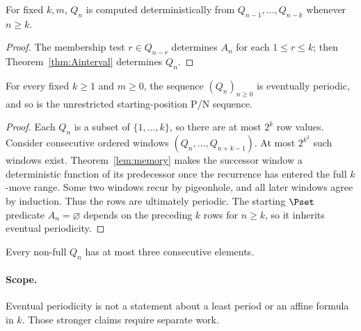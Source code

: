 \begin{lemma}\label{lem:memory}
For fixed $k,m$, $Q_n$ is computed deterministically from $Q_{n-1},\ldots,Q_{n-k}$ whenever $n\ge k$.
\end{lemma}
\begin{proof}The membership test $r\in Q_{n-r}$ determines $A_n$ for each $1\le r\le k$; then Theorem~\ref{thm:Ainterval} determines $Q_n$.\end{proof}

\begin{theorem}\label{thm:Aperiod}
For every fixed $k\ge1$ and $m\ge0$, the sequence $(Q_n)_{n\ge0}$ is eventually periodic, and so is the unrestricted starting-position P/N sequence.
\end{theorem}
\begin{proof}
Each $Q_n$ is a subset of $\{1,\ldots,k\}$, so there are at most $2^k$ row values. Consider consecutive ordered windows $(Q_n,\ldots,Q_{n+k-1})$. At most $2^{k^2}$ such windows exist. Theorem~\ref{lem:memory} makes the successor window a deterministic function of its predecessor once the recurrence has entered the full $k$-move range. Some two windows recur by pigeonhole, and all later windows agree by induction. Thus the rows are ultimately periodic. The starting $\Pset$ predicate $A_n=\varnothing$ depends on the preceding $k$ rows for $n\ge k$, so it inherits eventual periodicity.
\end{proof}
\begin{corollary}[Specialization $m=1$] Every non-full $Q_n$ has at most three consecutive elements.\end{corollary}
\paragraph{Scope.} Eventual periodicity is not a statement about a least period or an affine formula in $k$. Those stronger claims require separate work.
